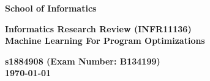 \documentclass[a4paper,11pt]{article}
\newcommand{\name}{s1884908 (Exam Number: B134199)}
\newcommand{\field}{Machine Learning For Program Optimizations}
\begin{document}
\begin{minipage}[b]{110mm}
        {\Huge\bf School of Informatics
        \vspace*{17mm}}
\end{minipage}
\hfill
\begin{minipage}[t]{40mm}               
\end{minipage}
\par\noindent
\vspace*{2cm}
\begin{center}
        \Large\bf Informatics Research Review  (INFR11136)\\
        \Large\bf \field
\end{center}
\vspace*{1.5cm}
\begin{center}
        \bf \name\\
        \monthyeardate\today
\end{center}
\vspace*{5mm}
\end{document}

